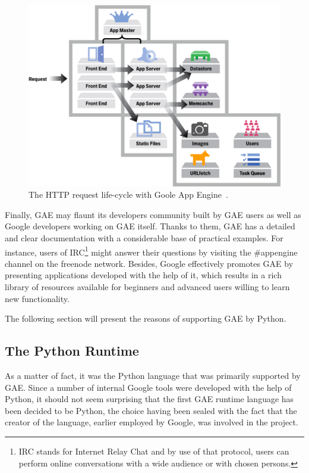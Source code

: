 \begin{figure}[h]
\begin{center}
\includegraphics[scale=0.4]{img/gae_request.png}
\caption{The HTTP request life-cycle with Goole App Engine~\cite{gae_request_cycle}.}
\label{fig:gae_request_cycle}
\end{center}
\end{figure}

Finally, GAE may flaunt its developers community built by GAE users as well as Google developers working on GAE itself. Thanks to them, GAE has a detailed and clear documentation with a considerable base of practical examples. For instance, users of IRC\footnote{IRC stands for Internet Relay Chat and by use of that protocol, users can perform online conversations with a wide audience or with chosen persons.} might answer their questions by visiting the \#appengine channel on the freenode network. Besides, Google effectively promotes GAE by presenting applications developed with the help of it, which results in a rich library of resources available for beginners and advanced users willing to learn new functionality.

The following section will present the reasons of supporting GAE by Python. 
  
  
\subsection{The Python Runtime}\label{subsec:gae_py}
As a matter of fact, it was the Python language that was primarily supported by GAE. Since a number of internal Google tools were developed with the help of Python, it should not seem surprising that the first GAE runtime language has been decided to be Python, the choice having been sealed with the fact that the creator of the language, earlier employed by Google, was involved in the project.

